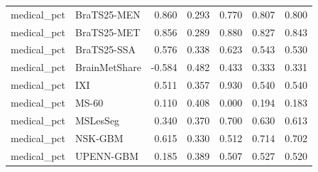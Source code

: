 \begin{tabular}{llrrrrr}
medical\_pct & BraTS25-MEN & 0.860 & 0.293 & 0.770 & 0.807 & 0.800 \\
medical\_pct & BraTS25-MET & 0.856 & 0.289 & 0.880 & 0.827 & 0.843 \\
medical\_pct & BraTS25-SSA & 0.576 & 0.338 & 0.623 & 0.543 & 0.530 \\
medical\_pct & BrainMetShare & -0.584 & 0.482 & 0.433 & 0.333 & 0.331 \\
medical\_pct & IXI & 0.511 & 0.357 & 0.930 & 0.540 & 0.540 \\
medical\_pct & MS-60 & 0.110 & 0.408 & 0.000 & 0.194 & 0.183 \\
medical\_pct & MSLesSeg & 0.340 & 0.370 & 0.700 & 0.630 & 0.613 \\
medical\_pct & NSK-GBM & 0.615 & 0.330 & 0.512 & 0.714 & 0.702 \\
medical\_pct & UPENN-GBM & 0.185 & 0.389 & 0.507 & 0.527 & 0.520 \\
\bottomrule
\end{tabular}
